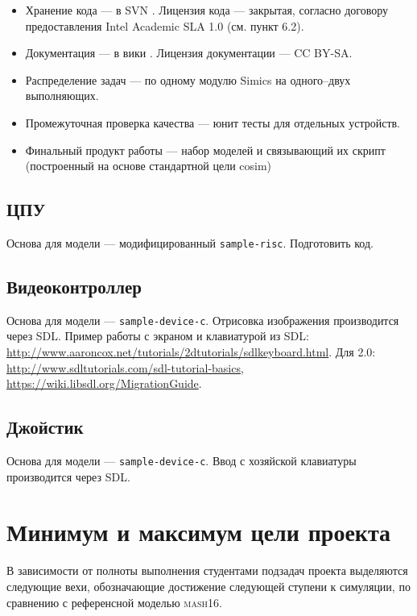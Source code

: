 \begin{itemize}
\item Хранение кода --- в SVN . Лицензия кода --- закрытая, согласно договору предоставления Intel Academic SLA 1.0 (см. пункт 6.2). 

\item Документация --- в вики . Лицензия документации --- CC BY-SA.

\item Распределение задач --- по одному модулю Simics на одного--двух выполняющих.
\item Промежуточная проверка качества --- юнит тесты для отдельных устройств.
\item Финальный продукт работы --- набор моделей и связывающий их скрипт (построенный на основе стандартной цели cosim)
\end{itemize}

\subsection{ЦПУ}

Основа для модели --- модифицированный \texttt{sample-risc}. \todo Подготовить код.

\subsection{Видеоконтроллер}

Основа для модели --- \texttt{sample-device-c}. Отрисовка изображения производится через SDL. Пример работы с экраном и клавиатурой из SDL: \url{http://www.aaroncox.net/tutorials/2dtutorials/sdlkeyboard.html}. Для 2.0: \url{http://www.sdltutorials.com/sdl-tutorial-basics}, \url{https://wiki.libsdl.org/MigrationGuide}.

\subsection{Джойстик}

Основа для модели --- \texttt{sample-device-c}. Ввод с хозяйской клавиатуры производится через SDL.

\section{Минимум и максимум цели проекта}

В зависимости от полноты выполнения студентами подзадач проекта выделяются следующие вехи, обозначающие достижение следующей ступени к симуляции, по сравнению с референсной моделью \textsc{mash16}.

